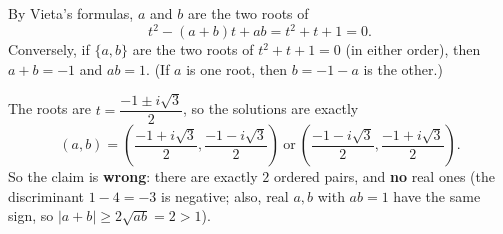 By Vieta's formulas, $a$ and $b$ are the two roots of
\[
t^2-(a+b)t+ab=t^2+t+1=0 .
\]
Conversely, if $\{a,b\}$ are the two roots of $t^2+t+1=0$ (in either order), then $a+b=-1$ and $ab=1$. (If $a$ is one root, then $b=-1-a$ is the other.)

The roots are $t=\dfrac{-1\pm i\sqrt3}{2}$, so the solutions are exactly
\[
\boxed{(a,b)=\left(\dfrac{-1+i\sqrt3}{2},\dfrac{-1-i\sqrt3}{2}\right)\ \text{or}\ \left(\dfrac{-1-i\sqrt3}{2},\dfrac{-1+i\sqrt3}{2}\right)} .
\]
So the claim is \textbf{wrong}: there are exactly $2$ ordered pairs, and \textbf{no} real ones (the discriminant $1-4=-3$ is negative; also, real $a,b$ with $ab=1$ have the same sign, so $|a+b|\ge2\sqrt{ab}=2>1$).
